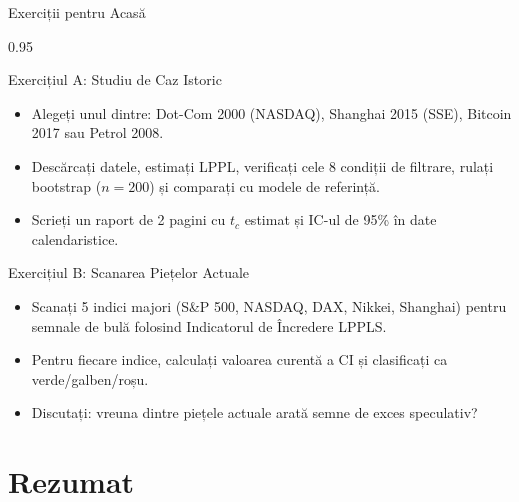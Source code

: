 \documentclass[9pt, aspectratio=169, t]{beamer}
\begin{document}
\begin{frame}{Exerciții pentru Acasă}
    \begin{cminipage}{0.95\textwidth}
    {\small
    \begin{block}{Exercițiul A: Studiu de Caz Istoric}
        \begin{itemize}\setlength{\itemsep}{2pt}
            \item Alegeți unul dintre: Dot-Com 2000 (NASDAQ), Shanghai 2015 (SSE), Bitcoin 2017 sau Petrol 2008.
            \item Descărcați datele, estimați LPPL, verificați cele 8 condiții de filtrare, rulați bootstrap ($n = 200$) și comparați cu modele de referință.
            \item Scrieți un raport de 2 pagini cu $t_c$ estimat și IC-ul de 95\% în date calendaristice.
        \end{itemize}
    \end{block}

    \vspace{-1mm}

    \begin{exampleblock}{Exercițiul B: Scanarea Piețelor Actuale}
        \begin{itemize}\setlength{\itemsep}{2pt}
            \item Scanați 5 indici majori (S\&P 500, NASDAQ, DAX, Nikkei, Shanghai) pentru semnale de bulă folosind Indicatorul de Încredere LPPLS.
            \item Pentru fiecare indice, calculați valoarea curentă a CI și clasificați ca verde/galben/roșu.
            \item Discutați: vreuna dintre piețele actuale arată semne de exces speculativ?
        \end{itemize}
    \end{exampleblock}
    }
    \end{cminipage}
\end{frame}

\section{Rezumat}
\end{document}
